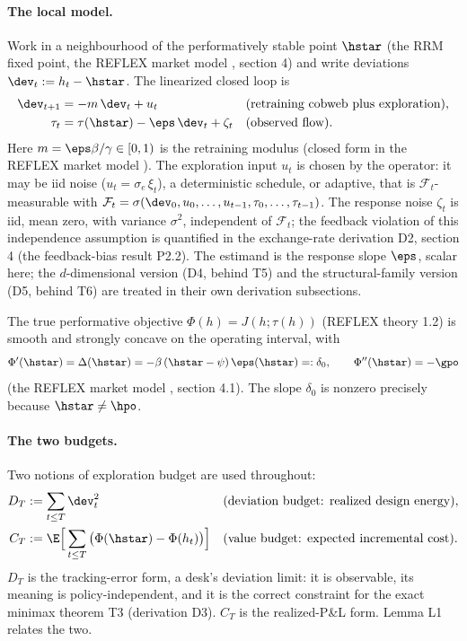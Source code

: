 \paragraph{The local model.}
Work in a neighbourhood of the performatively stable point $\hstar$ (the RRM
fixed point, the REFLEX market model \citep{reflex2026}, section 4) and write deviations
$\dev_t := h_t - \hstar$. The linearized closed loop is
\begin{align*}
  \dev_{t+1} &= -m\,\dev_t + u_t
    && \text{(retraining cobweb plus exploration)},\\
  \tau_t &= \tau(\hstar) - \eps\,\dev_t + \zeta_t
    && \text{(observed flow)}.
\end{align*}
Here $m = \eps\beta/\gamma \in [0,1)$ is the retraining modulus (closed form
in the REFLEX market model \citep{reflex2026}). The exploration input $u_t$ is chosen by the operator:
it may be iid noise ($u_t = \sigma_e\,\xi_t$), a deterministic schedule, or
adaptive, that is $\mathcal{F}_t$-measurable with
$\mathcal{F}_t = \sigma(\dev_0, u_0, \dots, u_{t-1}, \tau_0, \dots,
\tau_{t-1})$. The response noise $\zeta_t$ is iid, mean zero, with variance
$\sigma^2$, independent of $\mathcal{F}_t$; the feedback violation of this
independence assumption is quantified in the exchange-rate derivation D2,
section 4 (the feedback-bias result P2.2). The estimand is the response
slope $\eps$, scalar here; the $d$-dimensional version (D4, behind T5) and
the structural-family version (D5, behind T6) are treated in their own
derivation subsections.

The true performative objective $\Phi(h) = J(h; \tau(h))$ (REFLEX theory
1.2) is smooth and strongly concave on the operating interval, with
\begin{equation*}
  \Phi'(\hstar) = \Delta(\hstar) = -\beta\,(\hstar - \psi)\,\eps(\hstar)
  =: \delta_0, \qquad
  \Phi''(\hstar) = -\gpo
\end{equation*}
(the REFLEX market model \citep{reflex2026}, section 4.1). The slope $\delta_0$ is nonzero precisely
because $\hstar \neq \hpo$.

\paragraph{The two budgets.}
Two notions of exploration budget are used throughout:
\begin{align*}
  D_T &:= \sum_{t\le T} \dev_t^2
    && \text{(deviation budget: realized design energy)},\\
  C_T &:= \E\Big[\sum_{t\le T} \big(\Phi(\hstar) - \Phi(h_t)\big)\Big]
    && \text{(value budget: expected incremental cost)}.
\end{align*}
$D_T$ is the tracking-error form, a desk's deviation limit: it is
observable, its meaning is policy-independent, and it is the correct
constraint for the exact minimax theorem T3 (derivation D3). $C_T$ is the
realized-P\&L form. Lemma L1 relates the two.


